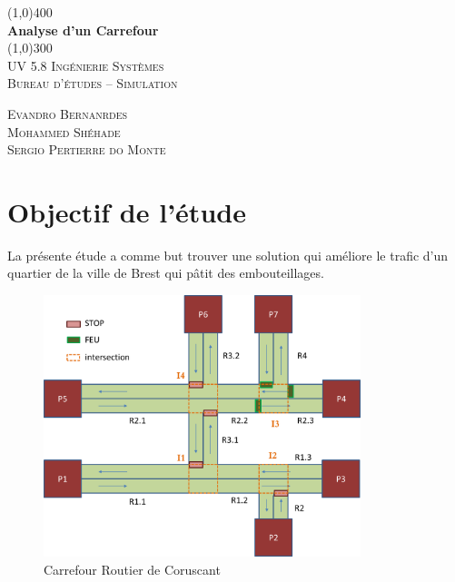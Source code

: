 \documentclass[12pt]{article} %
\begin{document}
\begin{titlepage}
	\begin{center}
	\line(1,0){400} \\
	[0.25in]
	\huge{\bfseries Analyse d'un Carrefour} \\
	[2mm]
	\line(1,0){300} \\
	[1.5cm]
	\textsc{\LARGE UV 5.8 Ingénierie Systèmes} \\
	[0.75cm]
	\textsc{\Large Bureau d'études – Simulation} \\
	[10cm]
	\end{center}
	\begin{flushright}
	\textsc{\large Evandro Bernanrdes \\ Mohammed Shéhade \\ Sergio Pertierre do Monte  \\}
	\end{flushright}

\end{titlepage}

\tableofcontents
\thispagestyle{empty}
\cleardoublepage


\listoffigures
\cleardoublepage

\setcounter{page}{1}

\section{Objectif de l'étude}\label{sec:1}
La présente étude a comme but trouver une solution qui améliore le trafic d'un quartier de la ville de Brest qui pâtit des embouteillages.

\begin{figure}[H]
	\centering
	\includegraphics[height=3in]{Figure1.png}
	\caption[Figure 1]{Carrefour Routier de Coruscant}
	\label{fig:fig1}
\end{figure}
\end{document}
